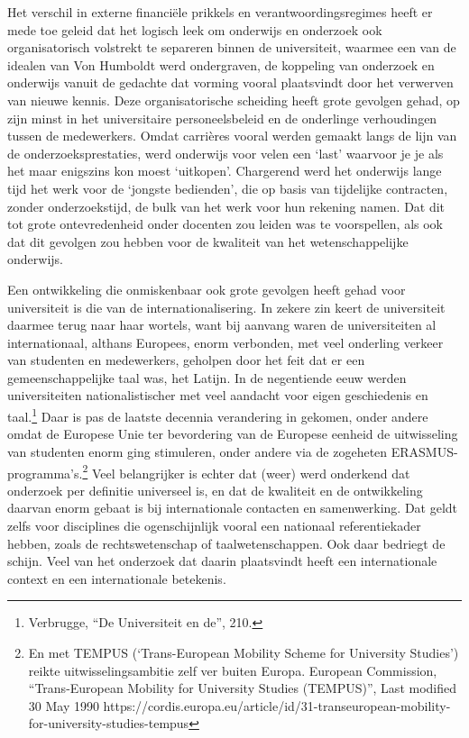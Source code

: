 \documentclass[empirical, authordate, ]{new-jote-article}
\begin{document}
	Het verschil in externe financiële prikkels en verantwoordingsregimes heeft er mede toe geleid dat het logisch leek om onderwijs en onderzoek ook organisatorisch volstrekt te separeren binnen de universiteit, waarmee een van de idealen van Von Humboldt werd ondergraven, de koppeling van onderzoek en onderwijs vanuit de gedachte dat vorming vooral plaatsvindt door het verwerven van nieuwe kennis. Deze organisatorische scheiding heeft grote gevolgen gehad, op zijn minst in het universitaire personeelsbeleid en de onderlinge verhoudingen tussen de medewerkers. Omdat carrières vooral werden gemaakt langs de lijn van de onderzoeksprestaties, werd onderwijs voor velen een ‘last' waarvoor je je als het maar enigszins kon moest ‘uitkopen'. Chargerend werd het onderwijs lange tijd het werk voor de ‘jongste bedienden', die op basis van tijdelijke contracten, zonder onderzoekstijd, de bulk van het werk voor hun rekening namen. Dat dit tot grote ontevredenheid onder docenten zou leiden was te voorspellen, als ook dat dit gevolgen zou hebben voor de kwaliteit van het wetenschappelijke onderwijs.



	Een ontwikkeling die onmiskenbaar ook grote gevolgen heeft gehad voor universiteit is die van de internationalisering. In zekere zin keert de universiteit daarmee terug naar haar wortels, want bij aanvang waren de universiteiten al internationaal, althans Europees, enorm verbonden, met veel onderling verkeer van studenten en medewerkers, geholpen door het feit dat er een gemeenschappelijke taal was, het Latijn. In de negentiende eeuw werden universiteiten nationalistischer met veel aandacht voor eigen geschiedenis en taal.\footnote{Verbrugge, “De Universiteit en de”, 210.} Daar is pas de laatste decennia verandering in gekomen, onder andere omdat de Europese Unie ter bevordering van de Europese eenheid de uitwisseling van studenten enorm ging stimuleren, onder andere via de zogeheten ERASMUS-programma's.\footnote{En met TEMPUS (‘Trans-European Mobility Scheme for University Studies') reikte uitwisselingsambitie zelf ver buiten Europa. European Commission, “Trans-European Mobility for University Studies (TEMPUS)”, Last modified 30 May 1990 https://cordis.europa.eu/article/id/31-transeuropean-mobility-for-university-studies-tempus } Veel belangrijker is echter dat (weer) werd onderkend dat onderzoek per definitie universeel is, en dat de kwaliteit en de ontwikkeling daarvan enorm gebaat is bij internationale contacten en samenwerking. Dat geldt zelfs voor disciplines die ogenschijnlijk vooral een nationaal referentiekader hebben, zoals de rechtswetenschap of taalwetenschappen. Ook daar bedriegt de schijn. Veel van het onderzoek dat daarin plaatsvindt heeft een internationale context en een internationale betekenis.
\end{document}

